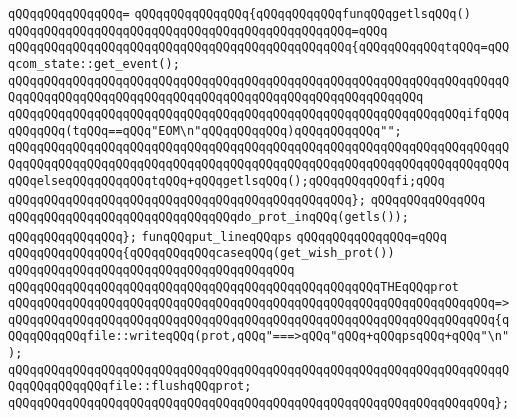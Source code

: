 \verb|qQQqqQQqqQQqqQQq=|\newline
\verb|qQQqqQQqqQQqqQQq{qQQqqQQqqQQqfunqQQqgetlsqQQq()|\newline
\verb|qQQqqQQqqQQqqQQqqQQqqQQqqQQqqQQqqQQqqQQqqQQqqQQq=qQQq|\newline
\verb|qQQqqQQqqQQqqQQqqQQqqQQqqQQqqQQqqQQqqQQqqQQqqQQq{qQQqqQQqqQQqtqQQq=qQQqcom_state::get_event();|\newline
\verb|qQQqqQQqqQQqqQQqqQQqqQQqqQQqqQQqqQQqqQQqqQQqqQQqqQQqqQQqqQQqqQQqqQQqqQQqqQQqqQQqqQQqqQQqqQQqqQQqqQQqqQQqqQQqqQQqqQQqqQQqqQQqqQQq|\newline
\verb|qQQqqQQqqQQqqQQqqQQqqQQqqQQqqQQqqQQqqQQqqQQqqQQqqQQqqQQqqQQqqQQqifqQQqqQQqqQQq(tqQQq==qQQq"EOM\n"qQQqqQQqqQQq)qQQqqQQqqQQq"";|\newline
\verb|qQQqqQQqqQQqqQQqqQQqqQQqqQQqqQQqqQQqqQQqqQQqqQQqqQQqqQQqqQQqqQQqqQQqqQQqqQQqqQQqqQQqqQQqqQQqqQQqqQQqqQQqqQQqqQQqqQQqqQQqqQQqqQQqqQQqqQQqqQQqqQQqelseqQQqqQQqqQQqtqQQq+qQQqgetlsqQQq();qQQqqQQqqQQqfi;qQQq|\newline
\verb|qQQqqQQqqQQqqQQqqQQqqQQqqQQqqQQqqQQqqQQqqQQqqQQq};|\newline
\verb|qQQqqQQqqQQqqQQq|\newline
\verb|qQQqqQQqqQQqqQQqqQQqqQQqqQQqqQQqdo_prot_inqQQq(getls());|\newline
\verb|qQQqqQQqqQQqqQQq};|\newline
\newline
\newline
\verb|funqQQqput_lineqQQqps|\newline
\verb|qQQqqQQqqQQqqQQq=qQQq|\newline
\verb|qQQqqQQqqQQqqQQq{qQQqqQQqqQQqcaseqQQq(get_wish_prot())|\newline
\verb|qQQqqQQqqQQqqQQqqQQqqQQqqQQqqQQqqQQqqQQq|\newline
\verb|qQQqqQQqqQQqqQQqqQQqqQQqqQQqqQQqqQQqqQQqqQQqqQQqqQQqTHEqQQqprot|\newline
\verb|qQQqqQQqqQQqqQQqqQQqqQQqqQQqqQQqqQQqqQQqqQQqqQQqqQQqqQQqqQQqqQQqqQQq=>|\newline
\verb|qQQqqQQqqQQqqQQqqQQqqQQqqQQqqQQqqQQqqQQqqQQqqQQqqQQqqQQqqQQqqQQqqQQq{qQQqqQQqqQQqfile::writeqQQq(prot,qQQq"===>qQQq"qQQq+qQQqpsqQQq+qQQq"\n");|\newline
\verb|qQQqqQQqqQQqqQQqqQQqqQQqqQQqqQQqqQQqqQQqqQQqqQQqqQQqqQQqqQQqqQQqqQQqqQQqqQQqqQQqqQQqfile::flushqQQqprot;|\newline
\verb|qQQqqQQqqQQqqQQqqQQqqQQqqQQqqQQqqQQqqQQqqQQqqQQqqQQqqQQqqQQqqQQqqQQq};|\newline
